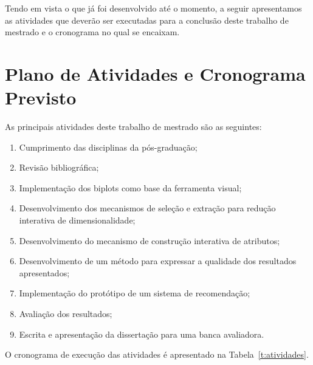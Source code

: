 Tendo em vista o que já foi desenvolvido até o momento, a
seguir apresentamos as atividades que deverão ser executadas
para a conclusão deste trabalho de mestrado e o cronograma
no qual se encaixam.

\clearpage

\section{Plano de Atividades e Cronograma Previsto}\label{sec:cronograma}

As principais atividades deste trabalho de mestrado são as seguintes:

\begin{enumerate}
    \item Cumprimento das disciplinas da pós-graduação;

    \item Revisão bibliográfica;

    \item Implementação dos biplots como base da
        ferramenta visual;

    \item Desenvolvimento dos mecanismos de seleção e
        extração para redução interativa de
        dimensionalidade;

    \item Desenvolvimento do mecanismo de construção
        interativa de atributos;

    \item Desenvolvimento de um método para expressar
        a qualidade dos resultados apresentados;

    \item Implementação do protótipo de um sistema de
        recomendação;

    \item Avaliação dos resultados;

    \item Escrita e apresentação da dissertação para uma banca
        avaliadora. 
\end{enumerate}

O cronograma de execução das atividades é apresentado na Tabela~\ref{t:atividades}. 

\newcommand{\y}{\color{black}\rule{35pt}{7pt}}
\newcommand{\x}{\hspace*{35pt}}
\renewcommand{\r}{\color{cinza}\rule{35pt}{7pt}}
\setlength{\tabcolsep}{0pt}

